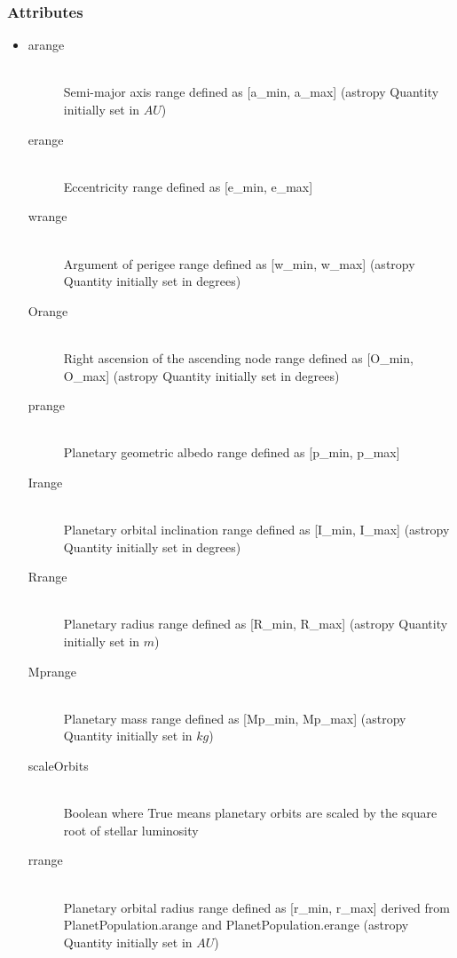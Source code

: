 \documentclass[cleanfoot]{asme2ej}
\begin{document}
\subsubsection*{Attributes}
\begin{itemize}
    \item
    \begin{description}
        \item[arange] \hfill \\
        Semi-major axis range defined as [a\_min, a\_max] (astropy Quantity initially set in $ AU $)
        \item[erange] \hfill \\
        Eccentricity range defined as [e\_min, e\_max]
        \item[wrange] \hfill \\
        Argument of perigee range defined as [w\_min, w\_max] (astropy Quantity initially set in degrees)
        \item[Orange] \hfill \\
        Right ascension of the ascending node range defined as [O\_min, O\_max]  (astropy Quantity initially set in degrees)
        \item[prange] \hfill \\
        Planetary geometric albedo range defined as [p\_min, p\_max]
        \item[Irange] \hfill \\
        Planetary orbital inclination range defined as [I\_min, I\_max]  (astropy Quantity initially set in degrees)
        \item[Rrange] \hfill \\
        Planetary radius range defined as [R\_min, R\_max] (astropy Quantity initially set in $ m $)
        \item[Mprange] \hfill \\
        Planetary mass range defined as [Mp\_min, Mp\_max] (astropy Quantity initially set in $ kg $)
        \item[scaleOrbits] \hfill \\
        Boolean where True means planetary orbits are scaled by the square root of stellar luminosity
        \item[rrange] \hfill \\
        Planetary orbital radius range defined as [r\_min, r\_max] derived from PlanetPopulation.arange and PlanetPopulation.erange (astropy Quantity initially set in $ AU $)
    \end{description}
\end{itemize}
\end{document}
